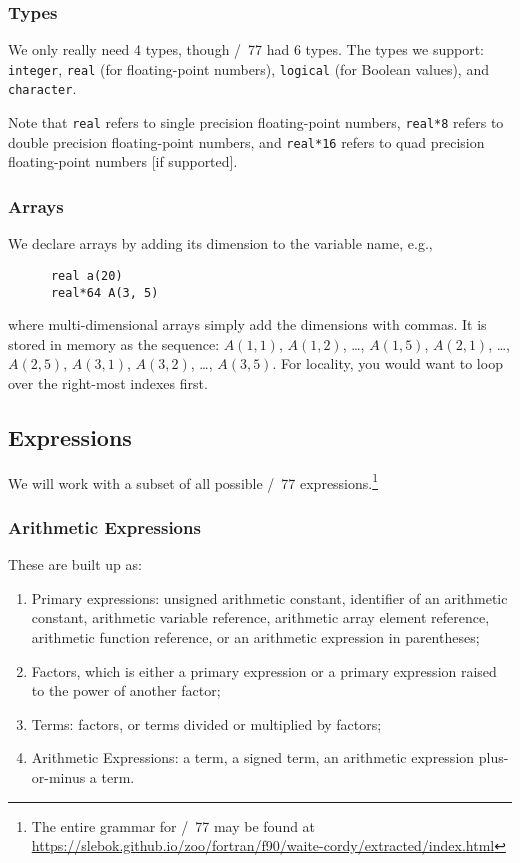 \subsubsection{Types}
We only really need 4 types, though \FORTRAN/~77 had 6 types. The types
we support: \texttt{integer}, \texttt{real} (for floating-point
numbers), \texttt{logical} (for Boolean values), and \texttt{character}.

Note that \texttt{real} refers to single precision floating-point
numbers, \texttt{real*8} refers to double precision floating-point
numbers, and \texttt{real*16} refers to quad precision floating-point
numbers [if supported].

\subsubsection{Arrays}
We declare arrays by adding its dimension to the variable name, e.g.,
\begin{lstlisting}
      real a(20)
      real*64 A(3, 5)
\end{lstlisting}
where multi-dimensional arrays simply add the dimensions with commas. It
is stored in memory as the sequence: $A(1,1)$, $A(1,2)$, \dots,
$A(1,5)$, $A(2,1)$, \dots, $A(2,5)$, $A(3,1)$, $A(3,2)$, \dots, $A(3,5)$.
For locality, you would want to loop over the right-most indexes first.

\subsection{Expressions}
We will work with a subset of all possible \FORTRAN/~77
expressions.\footnote{The entire grammar for \FORTRAN/~77 may be found
at \url{https://slebok.github.io/zoo/fortran/f90/waite-cordy/extracted/index.html}}

\subsubsection{Arithmetic Expressions}
These are built up as:
\begin{enumerate}
\item Primary expressions: unsigned arithmetic constant, identifier of
  an arithmetic constant, arithmetic variable reference, arithmetic
  array element reference, arithmetic function reference, or an
  arithmetic expression in parentheses;
\item Factors, which is either a primary expression or a primary
  expression raised to the power of another factor;
\item Terms: factors, or terms divided or multiplied by factors; 
\item Arithmetic Expressions: a term, a signed term, an arithmetic
  expression plus-or-minus a term.
\end{enumerate}


